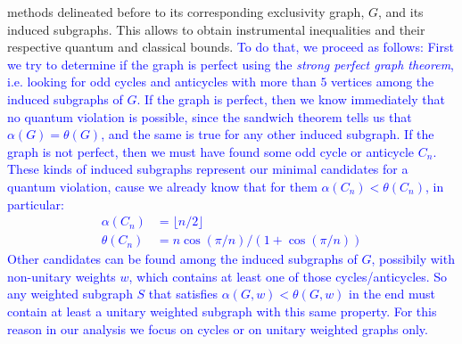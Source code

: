 \documentclass[letterpaper]{article}
\begin{document}
methods delineated before to its corresponding exclusivity graph, $G$,
and its induced subgraphs. This allows to obtain instrumental inequalities and
their respective quantum and classical bounds.
\textcolor{blue}{
To do that, we proceed as follows:
First we try to determine if the graph is perfect using the \emph{strong
perfect graph theorem}, i.e. looking for odd cycles and anticycles with
more than $5$ vertices among the induced subgraphs of $G$.
If the graph is perfect, then we know immediately that no quantum violation
is possible, since the sandwich theorem tells us that $\alpha(G) =
\theta(G)$, and the same is true for any other induced subgraph.
If the graph is not perfect, then we must have found some odd cycle or
anticycle $C_n$. These kinds of induced subgraphs represent our minimal
candidates for a quantum violation, cause we already know that for them
$\alpha(C_n) < \theta(C_n)$, in particular:
\begin{equation}
\begin{aligned}
    \alpha(C_n) &= \lfloor n/2 \rfloor \\ 
    \theta(C_n) &= n\cos(\pi/n)/(1+\cos(\pi/n))
\end{aligned}
\label{eq:cycle_alpha_theta}
\end{equation}
Other candidates can be found among the induced subgraphs of $G$, possibily with 
non-unitary weights $w$, which contains at least one of those cycles/anticycles.
So any weighted subgraph $S$ that satisfies $\alpha(G,w) < \theta(G,w)$ in the 
end must contain at least a unitary weighted subgraph with this same property.
For this reason in our analysis we focus on cycles or on unitary weighted graphs only.
}
\end{document}
